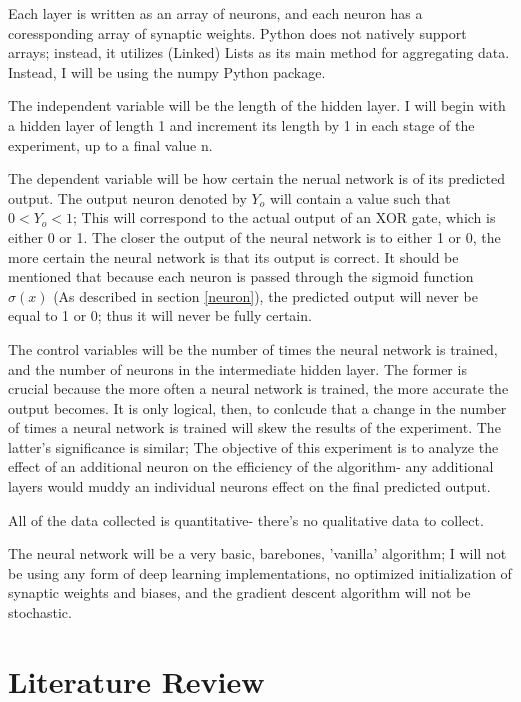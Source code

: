 \documentclass[12pt]{article}
\begin{document}
        Each layer is written as an array of neurons, and each neuron has a coressponding array of synaptic weights. Python does not natively support arrays; instead, it utilizes (Linked) Lists as its main method for aggregating data. Instead, I will be using the numpy Python package.

        The independent variable will be the length of the hidden layer. I will begin with a hidden layer of length 1 and increment its length by 1 in each stage of the experiment, up to a final value n.
        
        The dependent variable will be how certain the nerual network is of its predicted output. The output neuron denoted by \({Y_o}\) will contain a value such that \(0 < Y_o < 1\); This will correspond to the actual output of an XOR gate, which is either 0 or 1. The closer the output of the neural network is to either 1 or 0, the more certain the neural network is that its output is correct. It should be mentioned that because each neuron is passed through the sigmoid function \(\sigma(x)\) (As described in section \ref{neuron}), the predicted output will never be equal to 1 or 0; thus it will never be fully certain.

        The control variables will be the number of times the neural network is trained, and the number of neurons in the intermediate hidden layer. The former is crucial because the more often a neural network is trained, the more accurate the output becomes. It is only logical, then, to conlcude that a change in the number of times a neural network is trained will skew the results of the experiment. The latter's significance is similar; The objective of this experiment is to analyze the effect of an additional neuron on the efficiency of the algorithm- any additional layers would muddy an individual neurons effect on the final predicted output.

        All of the data collected is quantitative- there's no qualitative data to collect.


        The neural network will be a very basic, barebones, 'vanilla' algorithm; I will not be using any form of deep learning implementations, no optimized initialization of synaptic weights and biases, and the gradient descent algorithm will not be stochastic.

\section{Literature Review}
\end{document}
